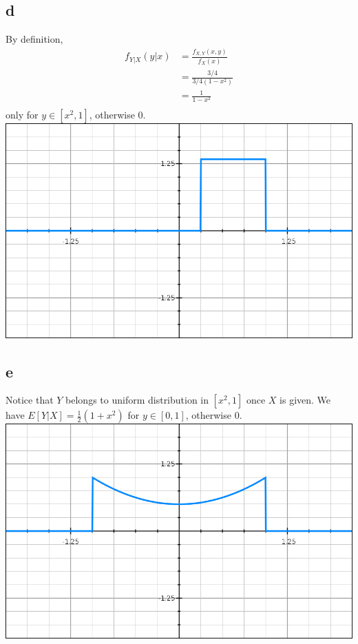 \documentclass[12pt,letterpaper]{article}
\begin{document}
    \subsection*{d}
        By definition,
        \begin{equation*}
            \begin{aligned}
                f_{Y | X}(y | x) &= \frac{f_{X, Y}(x, y)}{f_{X}(x)} \\
                &= \frac{3/4}{3/4 (1 - x^{2})} \\
                &= \frac{1}{1 - x^{2}} \\
            \end{aligned}
        \end{equation*}
        only for $y \in [x^{2}, 1]$, otherwise 0.
        \\
        {\center\includegraphics[scale=0.3]{graph.png}}
    \subsection*{e}
        Notice that $Y$ belongs to uniform distribution in $[x^{2}, 1]$ once $X$ is given. We have $E[Y|X] = \frac{1}{2}(1 + x^{2})$ for $y \in [0, 1]$, otherwise 0. \\
        {\center\includegraphics[scale=0.3]{graph2.png}}
\end{document}
